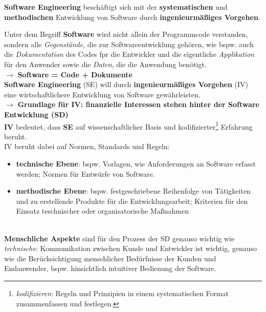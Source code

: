 

\begin{tcolorbox}[title={Sofwtare Engineering}]
    \textbf{Software Engineering} beschäftigt sich mit der \textbf{systematischen} und \textbf{methodischen} Entwicklung von Software durch \textbf{ingenieurmäßiges Vorgehen}.
\end{tcolorbox}

\noindent
Unter dem Begriff \textbf{Software} wird nicht allein der Programmcode verstanden, sondern alle \textit{Gegenstände}, die zur Softwareentwicklung gehören, wie bspw. auch die \textit{Dokumentation} des Codes fpr die Entwickler und die eigentliche \textit{Applikation} für den Anwender sowie die \textit{Daten}, die die Anwendung benötigt.\\
$\rightarrow$ \textbf{Software = Code + Dokumente}\\


\noindent
\textbf{Software Engineering} (SE) will durch \textbf{ingenieurmäßiges Vorgehen} (IV) eine wirtschaftlichere Entwicklung von Software gewährleisten.\\
$\rightarrow$ \textbf{Grundlage für IV: finanzielle Interessen stehen hinter der Software Entwicklung (SD)}\\

\noindent
\textbf{IV} bedeutet, dass \textbf{SE} auf wissenschaftlicher Basis und kodifizierter\footnote{
\textit{kodifizieren}: Regeln und Prinzipien in einem systematischen Format zusammenfassen und festlegen.
} Erfahrung beruht.\\

\noindent
IV beruht dabei auf Normen, Standards und Regeln:

\begin{itemize}
    \item\textbf{technische Ebene}: bspw. Vorlagen, wie Anforderungen an Software erfasst werden; Normen für Entwürfe von Software.
    \item \textbf{methodische Ebene}: bspw. festgeschriebene Reihenfolge von Tätigkeiten und zu erstellende Produkte für die Entwicklungsarbeit; Kriterien für den Einsatz teschnischer oder organisatorische Maßnahmen
\end{itemize}\\

\noindent
\textbf{Menschliche Aspekte} sind für den Prozess der SD genauso wichtig wie \textit{technische}: Kommunikation zwischen Kunde und Entwickler ist wichtig, genauso wie die Berücksichtigung menschlicher Bedürfnisse der Kunden und Endanwender, bspw. hinsichtlich intuitiver Bedienung der Software.